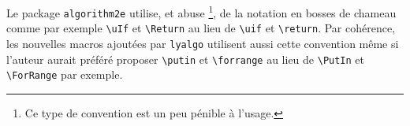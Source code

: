 Le package \verb+algorithm2e+ utilise, et abuse
\footnote{
	Ce type de convention est un peu pénible à l'usage.
},
de la notation en bosses de chameau comme par exemple \verb+\uIf+ et \verb+\Return+ au lieu de \verb+\uif+ et \verb+\return+.
Par cohérence, les nouvelles macros ajoutées par \verb+lyalgo+ utilisent aussi cette convention même si l'auteur aurait préféré proposer \verb+\putin+ et \verb+\forrange+ au lieu de \verb+\PutIn+ et \verb+\ForRange+ par exemple.
